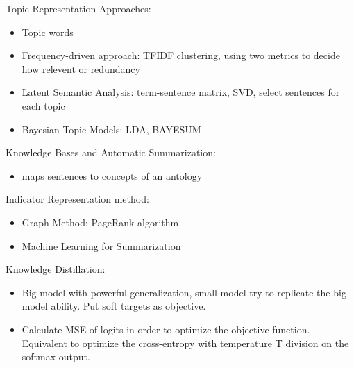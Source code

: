 \documentclass[12pt, letterpaper]{article}
\begin{document}
Topic Representation Approaches:
\begin{itemize}
	\item Topic words
	\item Frequency-driven approach: TFIDF clustering, using two metrics to decide how relevent or redundancy
	\item Latent Semantic Analysis: term-sentence matrix, SVD, select sentences for each topic
	\item Bayesian Topic Models: LDA, BAYESUM
\end{itemize}

Knowledge Bases and Automatic Summarization:
\begin{itemize}
	\item maps sentences to concepts of an antology
\end{itemize}

Indicator Representation method:
\begin{itemize}
	\item Graph Method: PageRank algorithm
	\item Machine Learning for Summarization
\end{itemize}

Knowledge Distillation:
\begin{itemize}
	\item Big model with powerful generalization, small model try to replicate the big model ability. Put soft targets as objective.
	\item Calculate MSE of logits in order to optimize the objective function. Equivalent to optimize the cross-entropy with temperature T division on the softmax output.
\end{itemize}
\end{document}
